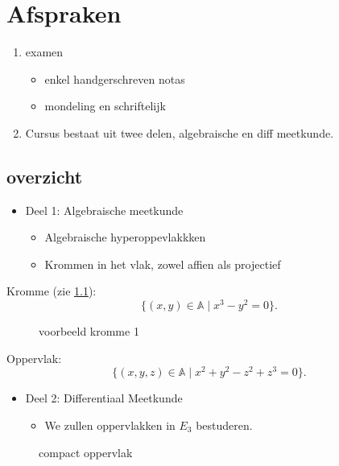 \setcounter{chapter}{-1}
\chapter{Afspraken}
\begin{enumerate}
	\item examen
		\begin{itemize}
			\item enkel handgerschreven notas
			\item mondeling en schriftelijk
		\end{itemize}
	\item Cursus bestaat uit twee delen, algebraische en diff meetkunde.
\end{enumerate}

\section{overzicht}
\begin{itemize}
	\item Deel 1: Algebraische meetkunde
		\begin{itemize}
			\item Algebraische hyperoppevlakkken
			\item Krommen in het vlak, zowel affien als projectief

		\end{itemize}
\end{itemize}
\begin{vb}
	Kromme (zie \cref{fig:voorbeeld-kromme-1}): \[
	\{(x,y) \in \mathbb{A} \mid x^3 - y^2 = 0 \} 
.\] 	
\begin{figure}[ht]
    \centering
    \caption{voorbeeld kromme 1}
    \label{fig:voorbeeld-kromme-1}
\end{figure}
Oppervlak: \[
	\{(x,y,z) \in \mathbb A \mid x^2 + y^2 - z^2 + z^3 = 0\} 
.\] 

\end{vb}
\begin{itemize}
	\item Deel 2: Differentiaal Meetkunde
		\begin{itemize}
			\item We zullen oppervlakken in $E_3$  bestuderen. 
		\end{itemize}
\end{itemize}
\begin{figure}[ht]
    \centering
    \caption{compact oppervlak}
    \label{fig:compact-oppervlak}
\end{figure}

